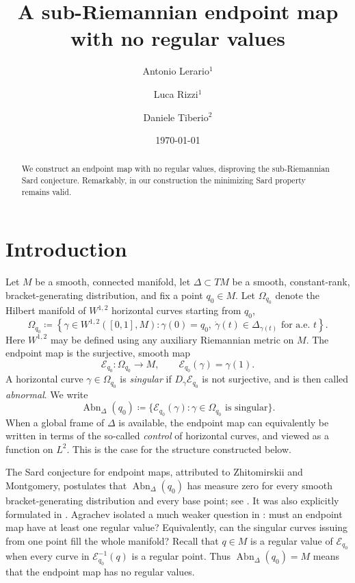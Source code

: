 \documentclass[11pt]{amsart}
\title[A sub-Riemannian endpoint map with no regular values]
{A sub-Riemannian endpoint map with no regular values}
\author{Antonio Lerario$^1$}
\author{Luca Rizzi$^1$}
\author{Daniele Tiberio$^2$}
\date{\today}
\numberwithin{equation}{section}
\theoremstyle{remark}
\newcommand{\Abn}{\operatorname{Abn}}
\begin{document}
\begin{abstract}
We construct an endpoint map with no regular values, disproving the sub-Riemannian Sard conjecture. Remarkably, in our construction the minimizing Sard property remains valid.
 
\end{abstract}

\maketitle

\section{Introduction}

Let $M$ be a smooth, connected manifold, let $\Delta\subset TM$ be a smooth,
constant-rank, bracket-generating distribution, and fix a point
$q_0\in M$.  Let $\Omega_{q_0}$ denote the Hilbert manifold of
$W^{1,2}$ horizontal curves starting from $q_0$,
\begin{equation}
 \Omega_{q_0}\coloneq 
 \left\{\gamma\in W^{1,2}([0,1],M):
 \gamma(0)=q_0,\ \dot\gamma(t)\in\Delta_{\gamma(t)}
 \text{ for a.e. }t\right\}.
\end{equation}
Here $W^{1,2}$ may be defined using any auxiliary Riemannian metric on
$M$.  The endpoint map is the surjective, smooth map
\begin{equation}
 \mathcal E_{q_0}:\Omega_{q_0}\longrightarrow M,
 \qquad
 \mathcal E_{q_0}(\gamma)=\gamma(1).
\end{equation}
A horizontal curve $\gamma\in\Omega_{q_0}$ is \emph{singular} if
$D_\gamma\mathcal E_{q_0}$ is not surjective, and is then called
\emph{abnormal}.  We write
\begin{equation}
 \Abn_\Delta(q_0)
 \coloneq \{\mathcal E_{q_0}(\gamma):\gamma\in\Omega_{q_0}
 \text{ is singular}\}.
\end{equation}
When a global frame of $\Delta$ is available, the endpoint map can equivalently be
written in terms of the so-called \emph{control} of horizontal curves, and viewed as a function on $L^2$. This is the case for the
structure constructed below.


The Sard conjecture for endpoint maps, attributed to Zhitomirskii and
Montgomery, postulates that $\Abn_\Delta(q_0)$ has measure zero for every
smooth bracket-generating distribution and every base point; see
\cite[Section~10.2]{Montgomery}.  It was also explicitly formulated in
\cite[Section~4.3]{RiffordTrelat}.  Agrachev isolated a much weaker
question in \cite[Problem~III]{AgrachevOpen}: must an endpoint map have
at least one regular value?  Equivalently, can the singular curves
issuing from one point fill the whole manifold?  Recall that $q\in M$
is a regular value of $\mathcal E_{q_0}$ when every curve in
$\mathcal E_{q_0}^{-1}(q)$ is a regular point.  Thus
$\Abn_\Delta(q_0)=M$ means that the endpoint map has no regular values.
\end{document}
